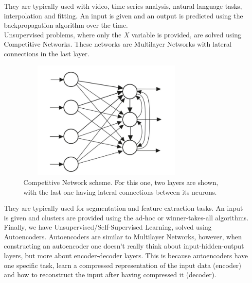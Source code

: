 They are typically used with video, time series analysis, natural language tasks, interpolation and fitting. An input is given and an output is predicted using the backpropagation algorithm over the time.\\

Unsupervised problems, where only the $X$ variable is provided, are solved using Competitive Networks. These networks are Multilayer Networks with lateral connections in the last layer.

\begin{figure}[h!]
  \begin{center}
    \includegraphics[width=90mm, height=60mm]{Figuras/CompetitiveNN.png}\par
    \caption{Competitive Network scheme. For this one, two layers are shown, with the last one having lateral connections between its neurons.}
    \label{fig:CompetitiveNN}
  \end{center}
\end{figure}

They are typically used for segmentation and feature extraction tasks. An input is given and clusters are provided using the ad-hoc or winner-takes-all algorithms.\\

Finally, we have Unsupervised/Self-Supervised Learning, solved using Autoencoders. Autoencoders are similar to Multilayer Networks, however, when constructing an autoencoder one doesn't really think about input-hidden-output layers, but more about encoder-decoder layers. This is because autoencoders have one specific task, learn a compressed representation of the input data (encoder) and how to reconstruct the input after having compressed it (decoder). \vspace{5cm}

